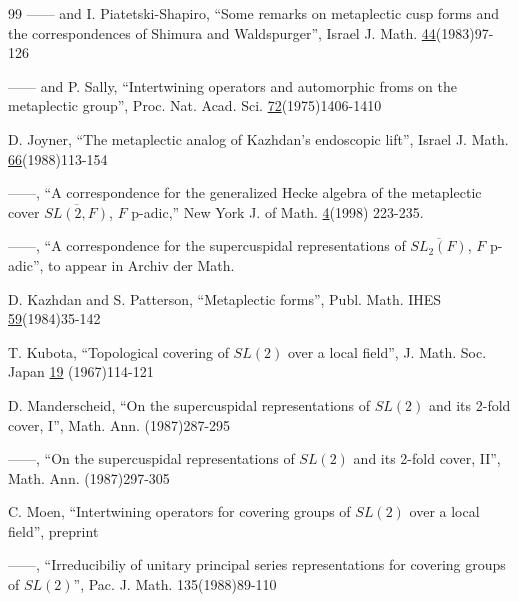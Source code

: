 \documentclass[twocolumn,10pt]{article}
\begin{document}
\begin{thebibliography}{99}
 ------ and I. Piatetski-Shapiro, ``Some remarks 
on metaplectic cusp
forms and the correspondences of Shimura and Waldspurger'', Israel 
J. Math.
\underline{44}(1983)97-126

 ------ and P. Sally, ``Intertwining operators and 
automorphic
froms on the metaplectic group'', Proc. Nat. Acad. Sci.
\underline{72}(1975)1406-1410

 D. Joyner, ``The metaplectic analog of 
Kazhdan's endoscopic lift'',
Israel J. Math. \underline{66}(1988)113-154

 ------, ``A correspondence for the generalized 
Hecke algebra of
the metaplectic cover $\overline{SL(2,F)}$, $F$ p-adic,'' 
New York J. of Math. \underline{4}(1998) 223-235.

 ------, ``A correspondence for the supercuspidal
representations of $\overline{SL_2(F)}$, $F$ p-adic'', 
to appear in Archiv der Math.

 D. Kazhdan and  S. Patterson, 
``Metaplectic forms'', 
Publ. Math. IHES \underline{59}(1984)35-142

 T. Kubota, ``Topological covering of $SL(2)$ over a 
local field'', J.
Math. Soc. Japan \underline{19} (1967)114-121



 D. Manderscheid, ``On the supercuspidal 
representations of
$SL(2)$ and its 2-fold cover, I'', Math. Ann. 
(1987)287-295

 ------, ``On the supercuspidal representations of
$SL(2)$ and its 2-fold cover, II'', Math. Ann.
(1987)297-305


 C. Moen, ``Intertwining operators for covering groups 
of $SL(2)$ over
a local field'', preprint

 ------, ``Irreducibiliy of unitary principal series 
representations
for covering groups of $SL(2)$'', Pac. J. Math. 135(1988)89-110


\end{thebibliography}
\end{document}

